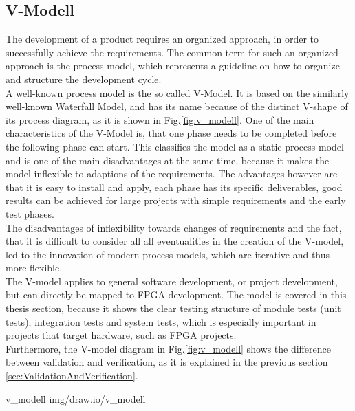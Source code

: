 \subsection{V-Modell}

The development of a product requires an organized approach, in order to successfully achieve the requirements.
The common term for such an organized approach is the process model, which represents a guideline on how to organize and structure the development cycle.\\

A well-known process model is the so called V-Model.
It is based on the similarly well-known Waterfall Model, and has its name because of the distinct V-shape of its process diagram, as it is shown in Fig.\ref{fig:v_modell}.
One of the main characteristics of the V-Model is, that one phase needs to be completed before the following phase can start.
This classifies the model as a static process model and is one of the main disadvantages at the same time, because it makes the model inflexible to adaptions of the requirements.
The advantages however are that it is easy to install and apply, each phase has its specific deliverables, good results can be achieved for large projects with simple requirements and the early test phases.\\

The disadvantages of inflexibility towards changes of requirements and the fact, that it is difficult to consider all all eventualities in the creation of the V-model, led to the innovation of modern process models, which are iterative and thus more flexible.\\

The V-model applies to general software development, or project development, but can directly be mapped to FPGA development.
The model is covered in this thesis section, because it shows the clear testing structure of module tests (unit tests), integration tests and system tests, which is especially important in projects that target hardware, such as FPGA projects.\\

Furthermore, the V-model diagram in Fig.\ref{fig:v_modell} shows the difference between validation and verification, as it is explained in the previous section \ref{sec:ValidationAndVerification}.

 {v_modell} {img/draw.io/v_modell}

